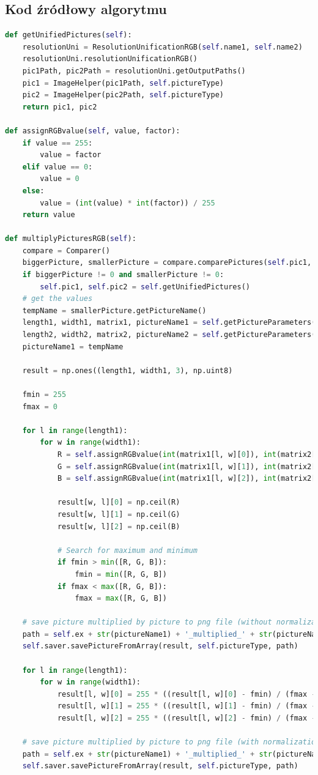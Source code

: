 \documentclass[a4paper,12pt, titlepage]{report}
\begin{document}
\subsection*{Kod źródłowy algorytmu}
\begin{lstlisting}[language=Python]
def getUnifiedPictures(self):
    resolutionUni = ResolutionUnificationRGB(self.name1, self.name2)
    resolutionUni.resolutionUnificationRGB()
    pic1Path, pic2Path = resolutionUni.getOutputPaths()
    pic1 = ImageHelper(pic1Path, self.pictureType)
    pic2 = ImageHelper(pic2Path, self.pictureType)
    return pic1, pic2

def assignRGBvalue(self, value, factor):
    if value == 255:
        value = factor
    elif value == 0:
        value = 0
    else:
        value = (int(value) * int(factor)) / 255
    return value
    
def multiplyPicturesRGB(self):
    compare = Comparer()
    biggerPicture, smallerPicture = compare.comparePictures(self.pic1, self.pic2)
    if biggerPicture != 0 and smallerPicture != 0:
        self.pic1, self.pic2 = self.getUnifiedPictures()
    # get the values
    tempName = smallerPicture.getPictureName()
    length1, width1, matrix1, pictureName1 = self.getPictureParameters(self.pic1)
    length2, width2, matrix2, pictureName2 = self.getPictureParameters(self.pic2)
    pictureName1 = tempName

    result = np.ones((length1, width1, 3), np.uint8)

    fmin = 255
    fmax = 0

    for l in range(length1):
        for w in range(width1):
            R = self.assignRGBvalue(int(matrix1[l, w][0]), int(matrix2[l, w][0]))
            G = self.assignRGBvalue(int(matrix1[l, w][1]), int(matrix2[l, w][1]))
            B = self.assignRGBvalue(int(matrix1[l, w][2]), int(matrix2[l, w][2]))

            result[w, l][0] = np.ceil(R)
            result[w, l][1] = np.ceil(G)
            result[w, l][2] = np.ceil(B)

            # Search for maximum and minimum
            if fmin > min([R, G, B]):
                fmin = min([R, G, B])
            if fmax < max([R, G, B]):
                fmax = max([R, G, B])

    # save picture multiplied by picture to png file (without normalization)
    path = self.ex + str(pictureName1) + '_multiplied_' + str(pictureName2) + '.png'
    self.saver.savePictureFromArray(result, self.pictureType, path)

    for l in range(length1):
        for w in range(width1):
            result[l, w][0] = 255 * ((result[l, w][0] - fmin) / (fmax - fmin))
            result[l, w][1] = 255 * ((result[l, w][1] - fmin) / (fmax - fmin))
            result[l, w][2] = 255 * ((result[l, w][2] - fmin) / (fmax - fmin))

    # save picture multiplied by picture to png file (with normalization)
    path = self.ex + str(pictureName1) + '_multiplied_' + str(pictureName2) + '_normalized.png'
    self.saver.savePictureFromArray(result, self.pictureType, path)
\end{lstlisting}
\end{document}

